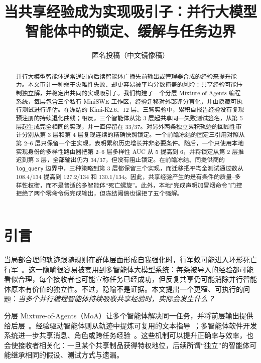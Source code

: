 \documentclass[UTF8,letterpaper,10pt,twocolumn]{ctexart}
\title{当共享经验成为实现吸引子：并行大模型智能体中的锁定、缓解与任务边界}
\author{匿名投稿（中文镜像稿）}
\date{}
\begin{document}
\maketitle

\begin{abstract}
并行大模型智能体通常通过向后续智能体广播先前输出或管理器合成的经验来提升能力。本文审计一种弱于灾难性失败、却更容易被平均分数掩盖的风险：共享经验可能压制独立解，并稳定出共同的实现吸引子。我们构建了一个分层 Mixture-of-Agents 编程系统，每层包含三个私有 MiniSWE 工作区，经验迁移对外部评分盲化，并由隐藏可执行测试进行评估。在冻结的 Kimi-K2.6、12 层、三臂实验中，累积自报告经验没有复现预注册的持续退化曲线；相反，三个智能体从第 3 层起共享同一失败测试签名，从第 5 层起生成完全相同的实现，并一直停留在 33/37。对另外两条独立累积轨迹的回顾性审计分别从第 3 层和第 4 层复现连续的精确快照锁定。一个前瞻冻结的固定三引用对照从第 2--6 层只保留一个主实现，表明累积历史增长并非必要条件。随后，一个只使用本地实现身份的多样性路由器把第 2--6 层多样性 AUC 从 5 提高到 6，并将锁定从第 2 层推迟到第 3 层，全部输出仍为 34/37，但没有阻止锁定。在前瞻冻结、同提供商的 \texttt{log\_query} 边界中，三种策略到第 3 层都保留三个实现，而迁移把平均全测试通过数从 108.4/134 提高到 127.2/134 和 130.1/134。因此，共享经验产生的是有条件的质量--多样性权衡，而不是普适的多智能体“死亡螺旋”。此外，本地“完成声明加冒烟命令”门控拒绝了两个零命令假完成输出，但冻结阈值也误拒了五个强解。
\end{abstract}

\section{引言}

当局部合理的轨迹跟随规则在群体层面形成自我强化时，行军蚁可能进入环形死亡行军~\citep{schneirla1944circularmill}。这一隐喻很容易被套用到多智能体大模型系统：每条被导入的经验都可能看似合理，每个接收者也可能宣称任务已经成功，但反复共享仍可能消除并行智能体原本有价值的独立性。不过，隐喻不是证据。本文提出一个更窄、可执行的问题：\emph{当多个并行编程智能体持续吸收共享经验时，实际会发生什么？}

分层 Mixture-of-Agents（MoA）让多个智能体解决同一任务，并将前层输出提供给后层~\citep{wang2024moa}。经验驱动智能体则从轨迹中提炼可复用的文本指导~\citep{zhao2024expel,shinn2023reflexion}；多智能体软件开发系统进一步共享消息、角色或跨任务经验~\citep{qian2024chatdev,qian2024colearning,li2025mael_full}。这些机制可以提升正确率与效率，也会使接收者相关化：一旦某个共享制品获得特权地位，后续所谓“独立”的智能体可能继承相同的假设、测试方式与遗漏。
\end{document}

